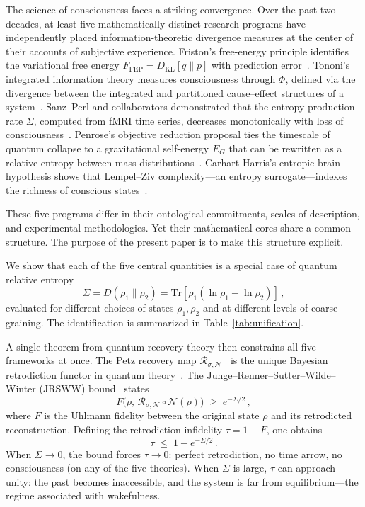 \documentclass[prl,twocolumn,superscriptaddress,longbibliography,floatfix]{revtex4-2}
\newcommand{\Tr}{\mathrm{Tr}}
\newcommand{\Petz}{\mathcal{R}}
\newcommand{\chan}{\mathcal{N}}
\newcommand{\tauasym}{\tau}
\newcommand{\DKL}{D_{\mathrm{KL}}}
\newcommand{\Ffriston}{F_{\mathrm{FEP}}}
\begin{document}
The science of consciousness faces a striking convergence.  Over the
past two decades, at least five mathematically distinct research
programs have independently placed information-theoretic divergence
measures at the center of their accounts of subjective experience.
Friston's free-energy principle identifies the variational free energy
$\Ffriston = \DKL[q\|p]$ with prediction error~\cite{Friston2019}.
Tononi's integrated information theory measures consciousness through
$\Phi$, defined via the divergence between the integrated and
partitioned cause--effect structures of a
system~\cite{Albantakis2023,Zanardi2018}.  Sanz~Perl and
collaborators demonstrated that the entropy production rate
$\dot{\Sigma}$, computed from fMRI time series, decreases
monotonically with loss of consciousness~\cite{SanzPerl2021}.
Penrose's objective reduction proposal ties the timescale of quantum
collapse to a gravitational self-energy $E_G$ that can be rewritten
as a relative entropy between mass
distributions~\cite{Penrose1996,Barbatti2024}.  Carhart-Harris's
entropic brain hypothesis shows that Lempel--Ziv complexity---an
entropy surrogate---indexes the richness of conscious
states~\cite{CarhartHarris2014,CarhartHarris2018}.

These five programs differ in their ontological commitments, scales of
description, and experimental methodologies.  Yet their mathematical
cores share a common structure.  The purpose of the present paper is
to make this structure explicit.

We show that each of the five central quantities is a special case of
quantum relative entropy
\begin{equation}
\Sigma = D(\rho_1\|\rho_2)
  = \Tr[\rho_1(\ln\rho_1 - \ln\rho_2)]\,,
\label{eq:QRE}
\end{equation}
evaluated for different choices of states $\rho_1,\rho_2$ and at
different levels of coarse-graining.  The identification is
summarized in Table~\ref{tab:unification}.

A single theorem from quantum recovery theory then constrains all
five frameworks at once.  The Petz recovery map
$\Petz_{\sigma,\chan}$~\cite{Petz1986,Petz1988} is the unique
Bayesian retrodiction functor in quantum
theory~\cite{Parzygnat2023}.  The Junge--Renner--Sutter--Wilde--Winter
(JRSWW) bound~\cite{Junge2018} states
\begin{equation}
F\bigl(\rho,\,\Petz_{\sigma,\chan}\circ\chan(\rho)\bigr)
  \;\geq\; e^{-\Sigma/2}\,,
\label{eq:JRSWW}
\end{equation}
where $F$ is the Uhlmann fidelity between the original state $\rho$
and its retrodicted reconstruction.  Defining the retrodiction
infidelity $\tauasym = 1-F$, one obtains
\begin{equation}
\tauasym \;\leq\; 1 - e^{-\Sigma/2}\,.
\label{eq:tau_bound}
\end{equation}
When $\Sigma\to 0$, the bound forces $\tauasym\to 0$: perfect
retrodiction, no time arrow, no consciousness (on any of the five
theories).  When $\Sigma$ is large, $\tauasym$ can approach unity:
the past becomes inaccessible, and the system is far from
equilibrium---the regime associated with wakefulness.
\end{document}
